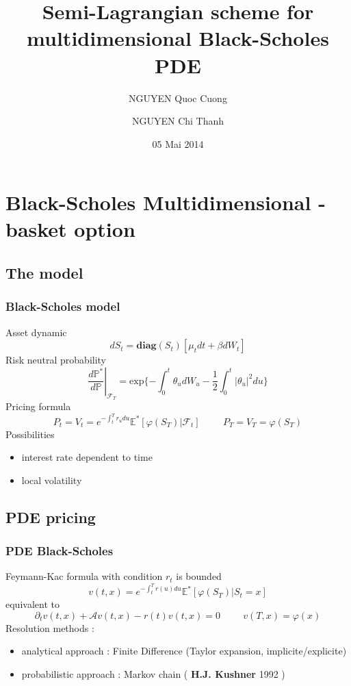 \documentclass[]{beamer}
\title[Semi-Lagrangian scheme multidimensional Black-Scholes]{Semi-Lagrangian scheme for multidimensional Black-Scholes PDE}
\author[Quoc Cuong NGUYEN and Chi Thanh NGUYEN]{NGUYEN Quoc Cuong \and NGUYEN Chi Thanh}
\institute[PDE - M2MO]{\large Profs : Y. Achdou - O. Bokanowski}
\date{05 Mai 2014}
\begin{document}
\footnotesize
\begin{frame}[plain]
\titlepage
\end{frame}

\begin{frame}
\tableofcontents
\end{frame}

\section{Black-Scholes Multidimensional - basket option}
\subsection{The model}
\begin{frame}
\frametitle{Black-Scholes model}
\small
Asset dynamic
\[
dS_t = \textbf{diag}(S_t) [\mu_t dt  +  \beta dW_t]
\]
Risk neutral probability
\[
\left. \frac{d \mathbb{P}^* }{d\mathbb{P}}\right|_{\mathcal{F}_T} 
= \text{exp}\{ - \int_0^t \theta_u dW_u - \frac{1}{2} \int_0^t |\theta_u|^2 du \}
\]
Pricing formula
\[
P_t = V_t = e^{ -\int_t^T r_u du } \mathbb{E}^* [\varphi(S_T) | \mathcal{F}_t]
\hspace{1cm}
P_T = V_T = \varphi(S_T)
\]
Possibilities
\begin{itemize}
 \item interest rate dependent to time
 \item local volatility
\end{itemize}
\end{frame}
\subsection{PDE pricing}
\begin{frame}
\frametitle{PDE Black-Scholes}
Feymann-Kac formula with condition $r_t$ is bounded
\[
v(t,x) = e^{ -\int_t^T r(u) du } \mathbb{E}^* [\varphi(S_T) | S_t = x]
\]
equivalent to
\[
\partial_t v(t,x) + \mathcal{A} v(t,x) - r(t)v(t,x) = 0 
\hspace{1cm}
v(T,x) = \varphi(x)
\]
Resolution methods :
\begin{itemize}
 \item analytical approach : Finite Difference (Taylor expansion, implicite/explicite)   
 \item probabilistic approach : Markov chain ( \textbf{H.J. Kushner} 1992 )
\end{itemize}
\end{frame}
\end{document}
